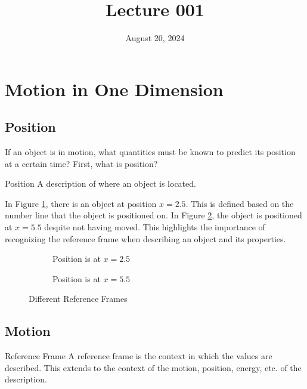 \documentclass[12pt, letterpaper]{article}
\title{Lecture 001}
\date{August 20, 2024}
\begin{document}
\section{Motion in One Dimension}
\label{sec:motionInOneDimension}

\subsection{Position}
\label{ssec:position}

If an object is in motion, what quantities must be known to predict its position at a
certain time? First, what is position?

\begin{definition}{Position}
  A description of where an object is located.
\end{definition}

In Figure \ref{fig:001}, there is an object at position $x=2.5$. This is defined based on
the number line that the object is positioned on. In Figure \ref{fig:002}, the object is
positioned at $x=5.5$ despite not having moved. This highlights the importance of recognizing
the reference frame when describing an object and its properties.

\begin{figure}[H]
  \centering
  \begin{subfigure}[H]{0.49\textwidth}
    \centering
    
    \caption{Position is at $x=2.5$}
    \label{fig:001}
  \end{subfigure}
  \begin{subfigure}[H]{0.49\textwidth}
    \centering
    
    \caption{Position is at $x=5.5$}
    \label{fig:002}
  \end{subfigure}
  \caption{Different Reference Frames}
  \label{fig:refFrame}
\end{figure}
\vspace{-25pt}

\subsection{Motion}
\label{ssec:motion}

\begin{definition}{Reference Frame}
  A reference frame is the context in which the values are described. This extends to the
  context of the motion, position, energy, etc. of the description.
\end{definition}
\end{document}
